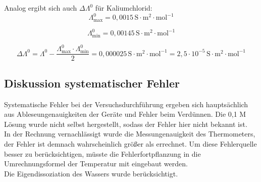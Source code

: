 \documentclass[12pt,a4paper,titlepage,headinclude,bibtotoc]{scrartcl}
\begin{document}
Analog ergibt sich auch $\Delta \Lambda^0$ für Kaliumchlorid:\\

\begin{equation}
\Lambda^0_\mathrm{max} = 0,0015\, \mathrm{S \cdot m^{2} \cdot mol^{-1}} 
\end{equation}

\begin{equation}
\Lambda^0_\mathrm{min} = 0,00145\, \mathrm{S \cdot m^{2} \cdot mol^{-1}} 
\end{equation}

\begin{equation}
\Delta \Lambda^0 = \Lambda^0 - \frac{\Lambda^0_\mathrm{max} \cdot \Lambda^0_\mathrm{min}}{2} = 0,000025 \, \mathrm{S \cdot m^{2} \cdot mol^{-1} = 2,5 \cdot 10^{-5}\, \mathrm{S \cdot m^{2} \cdot mol^{-1}}} 
\end{equation}





\subsection{Diskussion systematischer Fehler}

Systematische Fehler bei der Versuchsdurchführung ergeben sich hauptsächlich aus Ableseungenauigkeiten der Geräte und Fehler beim Verdünnen. Die 0,1 M Lösung wurde nicht selbst hergestellt, sodass der Fehler hier nicht bekannt ist.\\

In der Rechnung vernachlässigt wurde die Messungenauigkeit des Thermometers, der Fehler ist demnach wahrscheinlich größer als errechnet. Um diese Fehlerquelle besser zu berücksichtigen, müsste die Fehlerfortpflanzung in die Umrechnungsformel der Temperatur mit eingebaut werden.\\

Die Eigendissoziation des Wassers wurde berücksichtigt.\\
\end{document}
